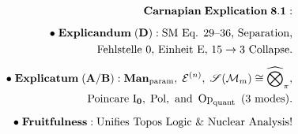 \documentclass[preview]{standalone}
\begin{document}
\begin{align*}
\special{dvisvgm:raw <g id='unique000'>}\mathbf{Carnapian\;Explication\;8.1:}\\[5pt]\bullet\;\mathbf{Explicandum\;(D):}\;\text{SM Eq. 29--36, Separation,}\\\;\;\text{Fehlstelle 0, Einheit E, }15\to 3\text{ Collapse.}\\[5pt]\bullet\;\mathbf{Explicatum\;(A/B):}\;\mathbf{Man}_{\text{param}},\;\mathcal{E}^{(n)},\;\mathscr{S}(\mathcal{M}_m)\cong\widehat{\bigotimes}_\pi,\\\;\;\text{Poincare }\mathrm{I}_{\mathbf{0}},\;\operatorname{Pol},\text{ and }\operatorname{Op}_{\text{quant}}\text{ (3 modes).}\\[5pt]\bullet\;\mathbf{Fruitfulness:}\;\text{Unifies Topos Logic \& Nuclear Analysis!}\special{dvisvgm:raw </g>}
\end{align*}
\end{document}
